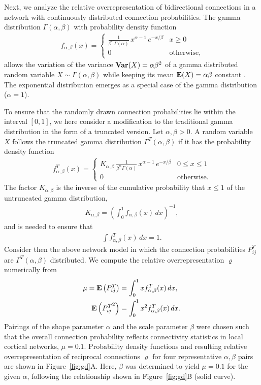 
Next, we analyze the relative overrepresentation of bidirectional
connections in a network with continuously distributed connection
probabilities. The gamma distribution $\Gamma(\alpha, \beta)$ with
probability density function
\begin{align}
    f_{\alpha,\beta}(x) = \begin{cases} 
\frac{1}{\beta^{\alpha}\Gamma(\alpha)}\, x^{\alpha-1}\,e^{-x/\beta} & x \geq 0 \\
0 & \text{otherwise},
\end{cases}
\end{align}
allows the variation of the variance $\operatorname{\mathbf{Var}}(X)= \alpha \beta^2 $ of a
gamma distributed random variable $X \sim \Gamma(\alpha, \beta)$ while
keeping its mean $\operatorname{\mathbf{E}}(X) = \alpha \beta $ constant \cite{Hogg1978}.
The exponential distribution emerges as a special case of the gamma
distribution ($\alpha =1$).

To ensure that the randomly drawn connection probabilities lie within the
interval $[0,1]$, we here consider a modification to the
traditional gamma distribution in the form of a truncated version. Let
$\alpha, \beta > 0$. A random variable $X$ follows the truncated gamma
distribution $\Gamma^T(\alpha, \beta)$ if it has the probability
density function
%
\begin{align}
  f_{\alpha,\beta}^T(x) = \begin{cases} K_{\alpha, \beta}\,
\frac{1}{\beta^{\alpha}\Gamma(\alpha)}\, x^{\alpha-1}\,e^{-x/\beta} & 0 \leq x \leq 1 \\
0 & \text{otherwise}.
\end{cases}
\end{align}
%
The factor $K_{\alpha,\beta}$ is the inverse of the cumulative
probability that $x \leq 1$ of the untruncated gamma distribution,
\begin{align}
  K_{\alpha,\beta} = \left(\int_0^{1} f_{\alpha,\beta}(x) \, dx \right)^{-1},
\end{align}
and is needed to ensure that
\begin{align}
  \int f_{\alpha,\beta}^T(x) \,dx = 1 \label{eq:gd1}.
\end{align}
Consider then the above network model in which the connection
probabilities $P_{ij}^T$ are $\Gamma^T(\alpha, \beta)$ distributed. We
compute the relative overrepresentation $\varrho$ numerically from
\begin{align}
  \mu = \operatorname{\mathbf{E}}\left(P_{ij}^T\right) &= \int_0^1 x f_{\alpha,\beta}^T(x)\, dx,\\
        \operatorname{\mathbf{E}}\left({P_{ij}^T}^2\right) &= \int_0^1 x^2 f_{\alpha,\beta}^T(x)\, dx.
\end{align}
%
Pairings of the shape parameter $\alpha$ and the scale parameter
$\beta$ were chosen such that the overall connection probability
reflects connectivity statistics in local cortical networks, $\mu =
0.1$. Probability density functions and resulting relative
overrepresentation of reciprocal connections $\varrho$ for four
representative $\alpha,\beta$ pairs are shown in
Figure~\ref{fig:gd}A. Here, $\beta$ was determined to yield $\mu =
0.1$ for the given $\alpha$, following the relationship shown in
Figure~\ref{fig:gd}B (solid curve).
\vspace{0.2cm}

